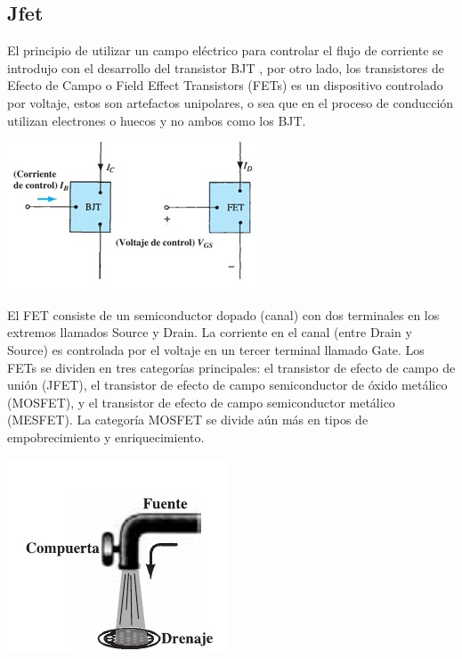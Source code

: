 \documentclass[12pt,a4paper]{article}
\begin{document}
\subsection{Jfet}
\begin{flushleft}
El principio de utilizar un campo eléctrico para controlar el flujo de corriente se introdujo con el desarrollo del transistor BJT , por otro lado, los transistores de Efecto de Campo o Field Effect Transistors (FETs) es un dispositivo controlado por voltaje, estos son artefactos unipolares, o sea que en el proceso de conducción utilizan electrones o huecos y no ambos como los BJT.\linebreak
\begin{center}
\includegraphics[scale=1.0]{imagenes/jfet.JPG}\linebreak
\end{center}
El FET consiste de un semiconductor dopado (canal) con dos terminales en los extremos llamados Source y Drain. La corriente en el canal (entre Drain y Source) es controlada por el voltaje en un tercer terminal llamado Gate.
Los FETs se dividen en tres categorías principales:  el transistor de efecto de campo de unión (JFET), el transistor de efecto de campo semiconductor de óxido metálico (MOSFET), y el transistor de efecto de campo semiconductor metálico (MESFET). La categoría MOSFET se divide aún más en tipos de empobrecimiento y enriquecimiento. \linebreak
\begin{center}
\includegraphics[scale=1.0]{imagenes/jfet1.JPG}\linebreak

\end{center}
\end{flushleft}
\end{document}
